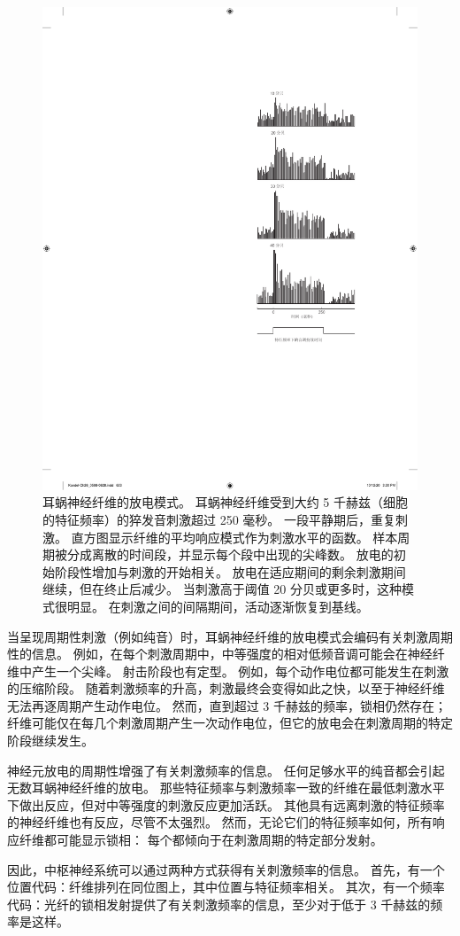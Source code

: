 \begin{figure}[htbp]
	\centering
	\includegraphics[width=0.5\linewidth]{chap26/fig_26_18}
	\caption{耳蜗神经纤维的放电模式。
		耳蜗神经纤维受到大约 5 千赫兹（细胞的特征频率）的猝发音刺激超过 250 毫秒。
		一段平静期后，重复刺激。
		直方图显示纤维的平均响应模式作为刺激水平的函数。
		样本周期被分成离散的时间段，并显示每个段中出现的尖峰数。
		放电的初始阶段性增加与刺激的开始相关。
		放电在适应期间的剩余刺激期间继续，但在终止后减少。
		当刺激高于阈值 20 分贝或更多时，这种模式很明显。
		在刺激之间的间隔期间，活动逐渐恢复到基线\cite{kiang1965discharge}。}
	\label{fig:26_18}
\end{figure}


当呈现周期性刺激（例如纯音）时，耳蜗神经纤维的放电模式会编码有关刺激周期性的信息。
例如，在每个刺激周期中，中等强度的相对低频音调可能会在神经纤维中产生一个尖峰。
射击阶段也有定型。
例如，每个动作电位都可能发生在刺激的压缩阶段。
随着刺激频率的升高，刺激最终会变得如此之快，以至于神经纤维无法再逐周期产生动作电位。
然而，直到超过 3 千赫兹的频率，锁相仍然存在；
纤维可能仅在每几个刺激周期产生一次动作电位，但它的放电会在刺激周期的特定阶段继续发生。


神经元放电的周期性增强了有关刺激频率的信息。
任何足够水平的纯音都会引起无数耳蜗神经纤维的放电。
那些特征频率与刺激频率一致的纤维在最低刺激水平下做出反应，但对中等强度的刺激反应更加活跃。
其他具有远离刺激的特征频率的神经纤维也有反应，尽管不太强烈。
然而，无论它们的特征频率如何，所有响应纤维都可能显示锁相：
每个都倾向于在刺激周期的特定部分发射。


因此，中枢神经系统可以通过两种方式获得有关刺激频率的信息。
首先，有一个位置代码：纤维排列在同位图上，其中位置与特征频率相关。
其次，有一个频率代码：光纤的锁相发射提供了有关刺激频率的信息，至少对于低于 3 千赫兹的频率是这样。



